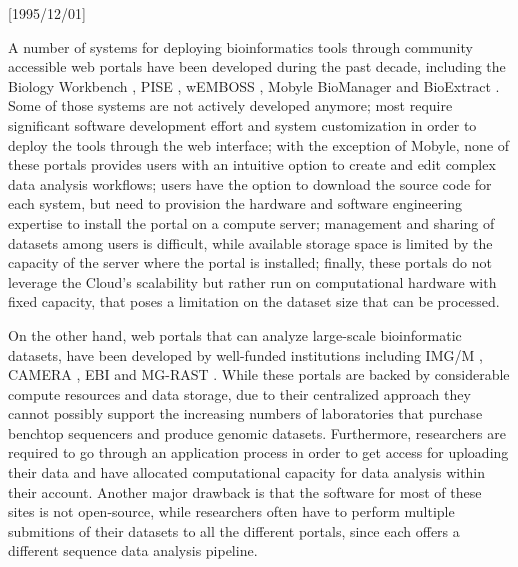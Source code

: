 \NeedsTeXFormat{LaTeX2e}[1995/12/01] \documentclass[10pt]{bmc_article}
\newenvironment{bmcformat}{\begin{raggedright}\baselineskip20pt\sloppy\setboolean{publ}{false}}{\end{raggedright}\baselineskip20pt\sloppy}
\begin{document}
\begin{bmcformat}
A number of systems for  deploying bioinformatics tools through community accessible web portals 
have been developed during the past decade, including the Biology Workbench \cite{Subramaniam1998Biology}, 
PISE \cite{Letondal2001Web}, wEMBOSS \cite{Sarachu2005WEMBOSS}, Mobyle \cite{Neron2009Mobyle}
BioManager \cite{Cattley2007BioManager} and BioExtract \cite{Lushbough2008Implementing}. Some 
of those systems are not actively developed anymore; most require significant software development effort 
and system customization in order to deploy the tools through the web interface; with the exception of Mobyle, 
none of these portals provides users with an intuitive option to create and edit complex data analysis workflows; 
users have the option to download the source code for each system, but need to provision the hardware and
software engineering expertise to install the portal on a compute server;  management and sharing of 
datasets among users is difficult, while available storage space is limited by the capacity of the server
where the portal is installed; finally, these portals do not leverage the Cloud's scalability but rather 
run on computational hardware with fixed capacity, that poses a limitation on the dataset size that can
be processed. 

On the other hand, web portals that can analyze large-scale bioinformatic datasets, have been developed by 
well-funded institutions including IMG/M \cite{Grigoriev2012}, CAMERA \cite{Altintas2010}, EBI \cite{Hunter2011} 
and MG-RAST \cite{Aziz2010}. While these portals are backed by considerable compute resources and data storage,  
due to their centralized approach they cannot possibly support the increasing numbers of laboratories that 
purchase benchtop sequencers and produce genomic datasets. Furthermore, researchers are required to go through 
an application process in order to get access for uploading their data and have allocated computational capacity  
for data analysis within their account. Another major drawback is that the software for most of these sites is not 
open-source, while researchers often have to perform multiple submitions of their datasets to all the different 
portals, since each offers a different sequence data analysis pipeline.   


\end{bmcformat}
\end{document}
